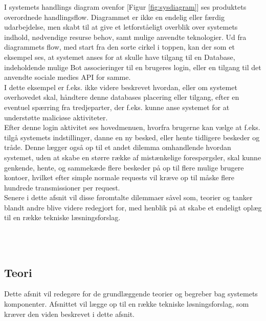 I systemets handlings diagram ovenfor [Figur \ref{fig:sysdiagram}] ses produktets overordnede handlingsflow. Diagrammet er ikke en endelig eller færdig udarbejdelse, men skabt til at give et letforståeligt overblik over systemets indhold, nødvendige resurse behov, samt mulige anvendte teknologier. Ud fra diagrammets flow, med start fra den sorte cirkel i toppen, kan der som et eksempel ses, at systemet anses for at skulle have tilgang til en Database, indeholdende mulige Bot associeringer til en brugeres login, eller en tilgang til det anvendte sociale medies API for samme.\\
I dette eksempel er f.eks. ikke videre beskrevet hvordan, eller om systemet overhovedet skal, håndtere denne databases placering eller tilgang, efter en eventuel spærring fra tredjeparter, der f.eks. kunne anse systemet for at understøtte maliciøse aktiviteter.\\
Efter denne login aktivitet ses hovedmenuen, hvorfra brugerne kan vælge at f.eks. tilgå systemets indstillinger, danne en ny besked, eller hente tidligere beskeder og tråde. Denne lægger også op til et andet dilemma omhandlende hvordan systemet, uden at skabe en større række af mistænkelige forespørgsler, skal kunne genkende, hente, og sammekæde flere beskeder på op til flere mulige brugere kontoer, hvilket efter simple normale requests vil kræve op til måske flere hundrede transmissioner per request.\\
Senere i dette afsnit vil disse føromtalte dilemmaer såvel som, teorier og tanker blandt andre blive videre redegjort for, med henblik på at skabe et endeligt oplæg til en række tekniske læsningsforslag.

\\\\



\subsection{Teori}
Dette afsnit vil redegøre for de grundlæggende teorier og begreber bag systemets komponenter. Afsnittet vil lægge op til en række tekniske løsningsforslag, som kræver den viden beskrevet i dette afsnit.

